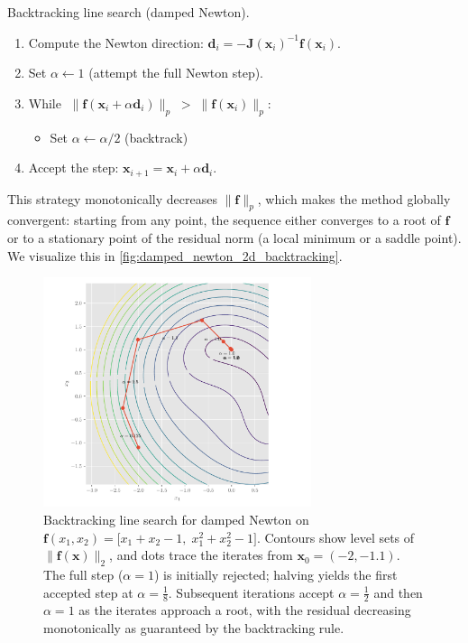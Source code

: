 \begin{algorithm}[H]
\caption{Backtracking line search (damped Newton).}
\begin{enumerate}
\item Compute the Newton direction: \(\mathbf{d}_i=-\mathbf{J}(\mathbf{x}_i)^{-1}\mathbf{f}(\mathbf{x}_i)\).
\item Set \(\alpha\leftarrow 1\) (attempt the full Newton step).
\item While \(\;\lVert \mathbf{f}(\mathbf{x}_i+\alpha\mathbf{d}_i)\rVert_p \;>\; \lVert \mathbf{f}(\mathbf{x}_i)\rVert_p:\)
\begin{itemize}
  \item Set \(\alpha \leftarrow \alpha/2\) \hfill (backtrack)
\end{itemize}
\item Accept the step: \(\mathbf{x}_{i+1}=\mathbf{x}_i+\alpha\mathbf{d}_i\).
\end{enumerate}
\end{algorithm}

This strategy monotonically decreases \(\lVert \mathbf{f}\rVert_p\), which makes the method globally convergent: starting from any point, the sequence either converges to a root of \(\mathbf{f}\) or to a stationary point of the residual norm (a local minimum or a saddle point). We visualize this in \autoref{fig:damped_newton_2d_backtracking}.

\begin{figure}[h]
\centering
\includegraphics[width=0.7\textwidth]{figs/nle/damped_newton_2d_backtracking.pdf}
\caption{Backtracking line search for damped Newton on \(\mathbf{f}(x_1,x_2)=\big[x_1+x_2-1,\;x_1^2+x_2^2-1\big]\). Contours show level sets of \(\|\mathbf{f}(\mathbf{x})\|_2\), and dots trace the iterates from \(\mathbf{x}_0=(-2,-1.1)\). The full step (\(\alpha=1\)) is initially rejected; halving yields the first accepted step at \(\alpha=\tfrac{1}{8}\). Subsequent iterations accept \(\alpha=\tfrac12\) and then \(\alpha=1\) as the iterates approach a root, with the residual decreasing monotonically as guaranteed by the backtracking rule.}
\label{fig:damped_newton_2d_backtracking}
\end{figure}

